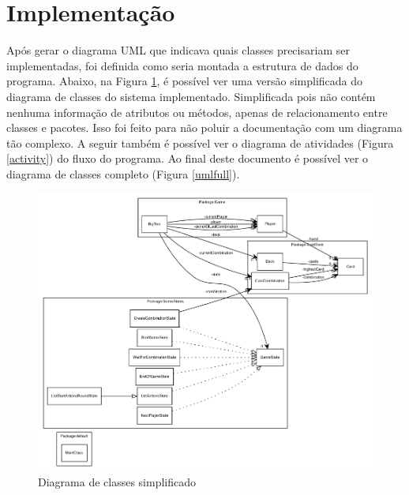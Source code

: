 \documentclass[12pt]{article}
\begin{document}
\section{Implementação}
\label{implementacao}

Após gerar o diagrama UML que indicava quais classes precisariam ser implementadas, foi definida como seria montada a estrutura de dados do programa. Abaixo, na Figura \ref{uml}, é possível ver uma versão simplificada do diagrama de classes do sistema implementado. Simplificada pois não contém nenhuma informação de atributos ou métodos, apenas de relacionamento entre classes e pacotes. Isso foi feito para não poluir a documentação com um diagrama tão complexo. A seguir também é possível ver o diagrama de atividades (Figura \ref{activity}) do fluxo do programa. Ao final deste documento é possível ver o diagrama de classes completo (Figura \ref{umlfull}).

\begin{figure}[h!]
	\centering
	\includegraphics[width=.8\textwidth]{umlsimple.png}
	\caption{Diagrama de classes simplificado}
	\label{uml}
\end{figure}

\vspace{0.8 true cm}
\end{document}
